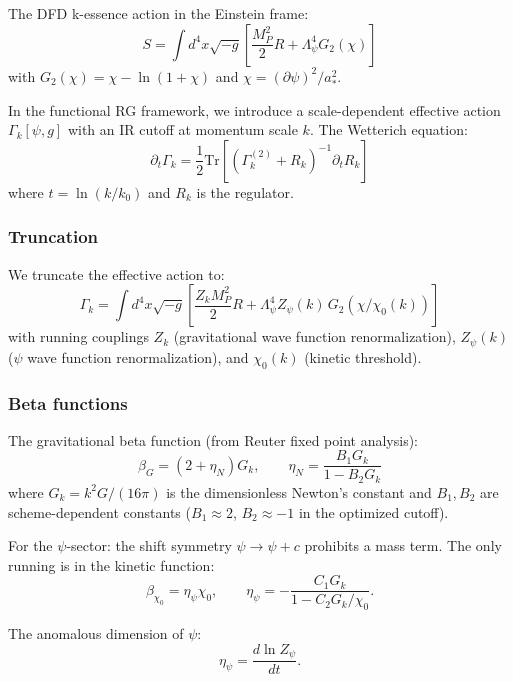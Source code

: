 \documentclass[11pt,a4paper]{article}
\begin{document}
The DFD k-essence action in the Einstein frame:
\begin{equation}
S = \int d^4x\sqrt{-g}\left[\frac{M_P^2}{2}R + \Lambda_\psi^4 G_2(\chi)\right]
\end{equation}
with $G_2(\chi) = \chi - \ln(1+\chi)$ and $\chi = (\partial\psi)^2/a_*^2$.

In the functional RG framework, we introduce a scale-dependent effective action $\Gamma_k[\psi, g]$ with an IR cutoff at momentum scale $k$. The Wetterich equation:
\begin{equation}
\partial_t \Gamma_k = \frac{1}{2}\text{Tr}\left[(\Gamma_k^{(2)} + R_k)^{-1}\partial_t R_k\right]
\end{equation}
where $t = \ln(k/k_0)$ and $R_k$ is the regulator.

\subsubsection{Truncation}

We truncate the effective action to:
\begin{equation}
\Gamma_k = \int d^4x\sqrt{-g}\left[\frac{Z_k M_P^2}{2}R + \Lambda_\psi^4 Z_\psi(k)\,G_2(\chi/\chi_0(k))\right]
\end{equation}
with running couplings $Z_k$ (gravitational wave function renormalization), $Z_\psi(k)$ ($\psi$ wave function renormalization), and $\chi_0(k)$ (kinetic threshold).

\subsubsection{Beta functions}

The gravitational beta function (from Reuter fixed point analysis):
\begin{equation}
\beta_G = (2 + \eta_N)G_k, \qquad \eta_N = \frac{B_1 G_k}{1 - B_2 G_k}
\end{equation}
where $G_k = k^2 G/(16\pi)$ is the dimensionless Newton's constant and $B_1, B_2$ are scheme-dependent constants ($B_1 \approx 2$, $B_2 \approx -1$ in the optimized cutoff).

For the $\psi$-sector: the shift symmetry $\psi \to \psi + c$ prohibits a mass term. The only running is in the kinetic function:
\begin{equation}
\beta_{\chi_0} = \eta_\psi \chi_0, \qquad \eta_\psi = -\frac{C_1 G_k}{1 - C_2 G_k/\chi_0}.
\end{equation}

The anomalous dimension of $\psi$:
\begin{equation}
\eta_\psi = \frac{d\ln Z_\psi}{dt}.
\end{equation}
\end{document}
